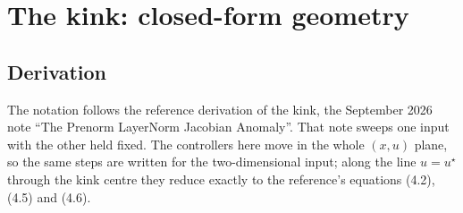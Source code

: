 \documentclass[11pt]{article}
\begin{document}
\section{The kink: closed-form geometry}\label{sec:kink}

\subsection{Derivation}
The notation follows the reference derivation of the kink, the September 2026 note ``The Prenorm LayerNorm Jacobian Anomaly''. That note sweeps one input with the other held fixed. The controllers here move in the whole $(x,u)$ plane, so the same steps are written for the two-dimensional input; along the line $u=u^\star$ through the kink centre they reduce exactly to the reference's equations (4.2), (4.5) and (4.6).
\end{document}

